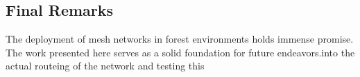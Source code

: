 \subsection{Final Remarks}
The deployment of mesh networks in forest environments holds immense promise. The work presented here serves as a solid foundation for future endeavors.into the actual routeing of the network and testing this